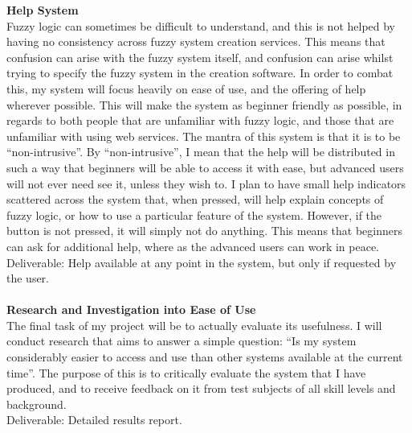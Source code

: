 \documentclass[a4paper,twoside,notitlepage,11pt]{article}
\begin{document}
\newpage
\noindent
\textbf{Help System}\ \\
Fuzzy logic can sometimes be difficult to understand, and this is not helped by having no consistency across fuzzy system creation services. This means that confusion can arise with the fuzzy system itself, and confusion can arise whilst trying to specify the fuzzy system in the creation software. In order to combat this, my system will focus heavily on ease of use, and the offering of help wherever possible. This will make the system as beginner friendly as possible, in regards to both people that are unfamiliar with fuzzy logic, and those that are unfamiliar with using web services. The mantra of this system is that it is to be ``non-intrusive''. By ``non-intrusive'', I mean that the help will be distributed in such a way that beginners will be able to access it with ease, but advanced users will not ever need see it, unless they wish to. I plan to have small help indicators scattered across the system that, when pressed, will help explain concepts of fuzzy logic, or how to use a particular feature of the system. However, if the button is not pressed, it will simply not do anything. This means that beginners can ask for additional help, where as the advanced users can work in peace.
\ \\
Deliverable: Help available at any point in the system, but only if requested by the user.\ \\
\ \\
\noindent
\textbf{Research and Investigation into Ease of Use}\ \\
The final task of my project will be to actually evaluate its usefulness. I will conduct research that aims to answer a simple question: ``Is my system considerably easier to access and use than other systems available at the current time''. The purpose of this is to critically evaluate the system that I have produced, and to receive feedback on it from test subjects of all skill levels and background.
\ \\
Deliverable: Detailed results report.
\newpage
\end{document}
